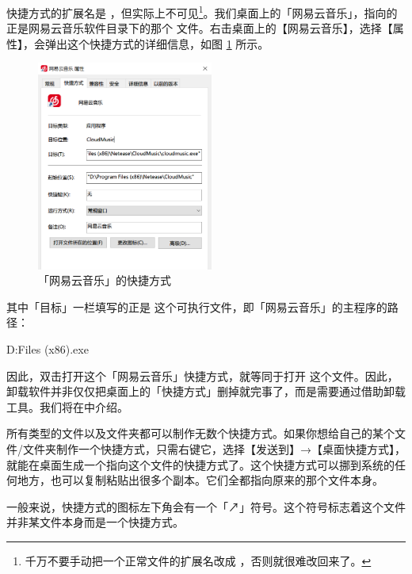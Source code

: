 {{快捷方式的扩展名是 ，但实际上不可见\cprotect\footnote{千万不要手动把一个正常文件的扩展名改成 ，否则就很难改回来了。}。我们桌面上的「网易云音乐」，指向的正是网易云音乐软件目录下的那个  文件。右击桌面上的【网易云音乐】，选择【属性】，会弹出这个快捷方式的详细信息，如图 \ref{fig:Link_properties} 所示。

\begin{figure}
  \centering
  \includegraphics[width=5.8cm]{assets/basic/Link_properties.png}
  \caption{「网易云音乐」的快捷方式}
  \label{fig:Link_properties}
\end{figure}

其中「目标」一栏填写的正是  这个可执行文件，即「网易云音乐」的主程序的路径：

\begin{MissingVerbatim}
  D:\Program Files (x86)\Netease\CloudMusic\cloudmusic.exe
\end{MissingVerbatim}

因此，双击打开这个「网易云音乐」快捷方式，就等同于打开  这个文件。\cprotect{}因此，卸载软件并非仅仅把桌面上的「快捷方式」删掉就完事了，而是需要通过借助卸载工具。我们将在中介绍。

所有类型的文件以及文件夹都可以制作无数个快捷方式。如果你想给自己的某个文件/文件夹制作一个快捷方式，只需右键它，选择【发送到】→【桌面快捷方式】，就能在桌面生成一个指向这个文件的快捷方式了。这个快捷方式可以挪到系统的任何地方，也可以复制粘贴出很多个副本。它们全都指向原来的那个文件本身。

一般来说，快捷方式的图标左下角会有一个「↗」符号。这个符号标志着这个文件并非某文件本身而是一个快捷方式。

}}

